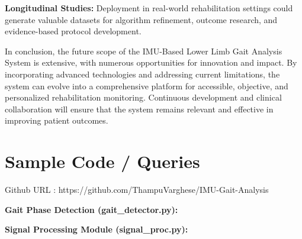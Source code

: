 \documentclass[12pt,a4paper]{report}
\begin{document}
\vspace{0.3cm}

\textbf{Longitudinal Studies:}  
Deployment in real-world rehabilitation settings could generate valuable datasets for algorithm refinement, outcome research, and evidence-based protocol development.

\vspace{0.5cm}

In conclusion, the future scope of the IMU-Based Lower Limb Gait Analysis System is extensive, with numerous opportunities for innovation and impact. By incorporating advanced technologies and addressing current limitations, the system can evolve into a comprehensive platform for accessible, objective, and personalized rehabilitation monitoring. Continuous development and clinical collaboration will ensure that the system remains relevant and effective in improving patient outcomes.


\clearpage

\setcounter{chapter}{8}
\setcounter{section}{0}
\clearpage
\thispagestyle{empty}

\noindent
{}

\clearpage
{}

\pagestyle{maincontent}


\section{Sample Code / Queries}

Github URL : https://github.com/ThampuVarghese/IMU-Gait-Analysis

\textbf{Gait Phase Detection (gait\_detector.py):}


\vspace{0.5cm}


\textbf{Signal Processing Module (signal\_proc.py):}

\end{document}
